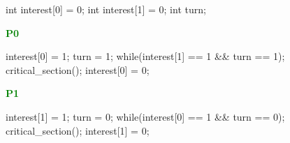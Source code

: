 \documentclass[varwidth=29em,crop]{standalone}
\begin{document}
\begin{center}
  \begin{varwidth}{.5\textwidth}
    \begin{ccode}
int interest[0] = 0;
int interest[1] = 0;
int turn;        
    \end{ccode}
  \end{varwidth}
\end{center}

\begin{minipage}{.45\linewidth}
  \textbf{\textcolor{Green}{P0}}
  \begin{ccode}
interest[0] = 1;
turn = 1;
while(interest[1] == 1 
          && turn == 1);
critical_section();
interest[0] = 0;
  \end{ccode}
\end{minipage}\hfill
\begin{minipage}{.45\linewidth}
  \textbf{\textcolor{Green}{P1}}
  \begin{ccode}
interest[1] = 1;
turn = 0;
while(interest[0] == 1
          && turn == 0);
critical_section();
interest[1] = 0;      
  \end{ccode}
\end{minipage}
\end{document}
